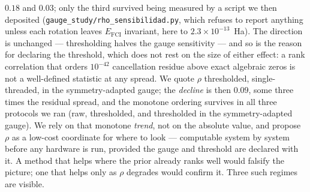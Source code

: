 \documentclass[onecolumn,a4paper]{quantumarticle}
\begin{document}
$0.18$ and $0.03$; only the third survived being measured by a script we then deposited (\texttt{gauge\_study/rho\_sensibilidad.py}, which refuses to report anything unless each rotation leaves $E_{\mathrm{FCI}}$ invariant, here to $2.3\times10^{-13}$~Ha). The direction is unchanged --- thresholding halves the gauge sensitivity --- and so is the reason for declaring the threshold, which does not rest on the size of either effect: a rank correlation that orders $10^{-42}$ cancellation residue above exact algebraic zeros is not a well-defined statistic at any spread. We quote $\rho$ thresholded, single-threaded, in the symmetry-adapted gauge; the \emph{decline} is then $0.09$, some three times the residual spread, and the monotone ordering survives in all three protocols we ran (raw, thresholded, and thresholded in the symmetry-adapted gauge). We rely on that monotone \emph{trend}, not on the absolute value, and propose $\rho$ as a low-cost coordinate for where to look --- computable system by system before any hardware is run, provided the gauge and threshold are declared with it. A method that helps where the prior already ranks well would falsify the picture; one that helps only as $\rho$ degrades would confirm it. Three such regimes are visible.
\end{document}
